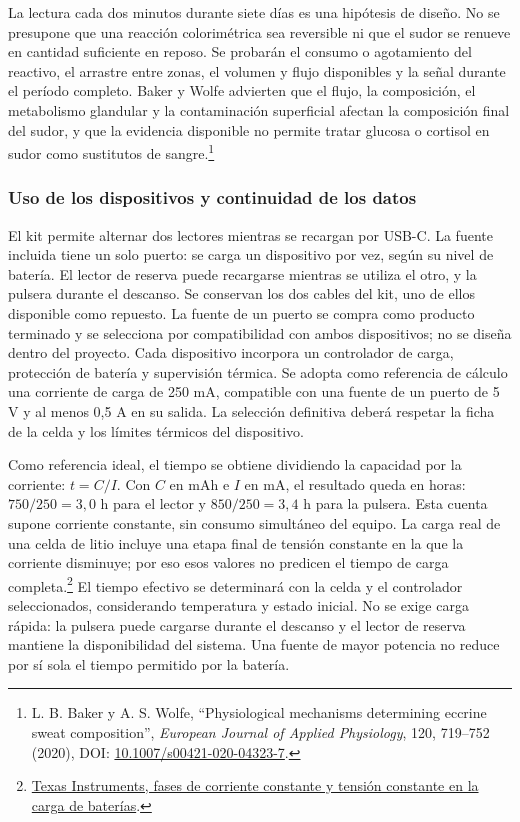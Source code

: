 La lectura cada dos minutos durante siete días es una hipótesis de diseño. No se presupone que una reacción colorimétrica sea reversible ni que el sudor se renueve en cantidad suficiente en reposo. Se probarán el consumo o agotamiento del reactivo, el arrastre entre zonas, el volumen y flujo disponibles y la señal durante el período completo. Baker y Wolfe advierten que el flujo, la composición, el metabolismo glandular y la contaminación superficial afectan la composición final del sudor, y que la evidencia disponible no permite tratar glucosa o cortisol en sudor como sustitutos de sangre.\footnote{L. B. Baker y A. S. Wolfe, ``Physiological mechanisms determining eccrine sweat composition'', \textit{European Journal of Applied Physiology}, 120, 719--752 (2020), DOI: \href{https://doi.org/10.1007/s00421-020-04323-7}{10.1007/s00421-020-04323-7}.}

\subsubsection{Uso de los dispositivos y continuidad de los datos}\label{sec:uso-dispositivos}
El kit permite alternar dos lectores mientras se recargan por USB-C. La fuente incluida tiene un solo puerto: se carga un dispositivo por vez, según su nivel de batería. El lector de reserva puede recargarse mientras se utiliza el otro, y la pulsera durante el descanso. Se conservan los dos cables del kit, uno de ellos disponible como repuesto. La fuente de un puerto se compra como producto terminado y se selecciona por compatibilidad con ambos dispositivos; no se diseña dentro del proyecto. Cada dispositivo incorpora un controlador de carga, protección de batería y supervisión térmica. Se adopta como referencia de cálculo una corriente de carga de 250 mA, compatible con una fuente de un puerto de 5 V y al menos 0,5 A en su salida. La selección definitiva deberá respetar la ficha de la celda y los límites térmicos del dispositivo.

Como referencia ideal, el tiempo se obtiene dividiendo la capacidad por la corriente: $t=C/I$. Con $C$ en mAh e $I$ en mA, el resultado queda en horas: $750/250=3{,}0$ h para el lector y $850/250=3{,}4$ h para la pulsera. Esta cuenta supone corriente constante, sin consumo simultáneo del equipo. La carga real de una celda de litio incluye una etapa final de tensión constante en la que la corriente disminuye; por eso esos valores no predicen el tiempo de carga completa.\footnote{\href{https://www.ti.com/document-viewer/lit/html/SSZTA38}{Texas Instruments, fases de corriente constante y tensión constante en la carga de baterías}.} El tiempo efectivo se determinará con la celda y el controlador seleccionados, considerando temperatura y estado inicial. No se exige carga rápida: la pulsera puede cargarse durante el descanso y el lector de reserva mantiene la disponibilidad del sistema. Una fuente de mayor potencia no reduce por sí sola el tiempo permitido por la batería.

